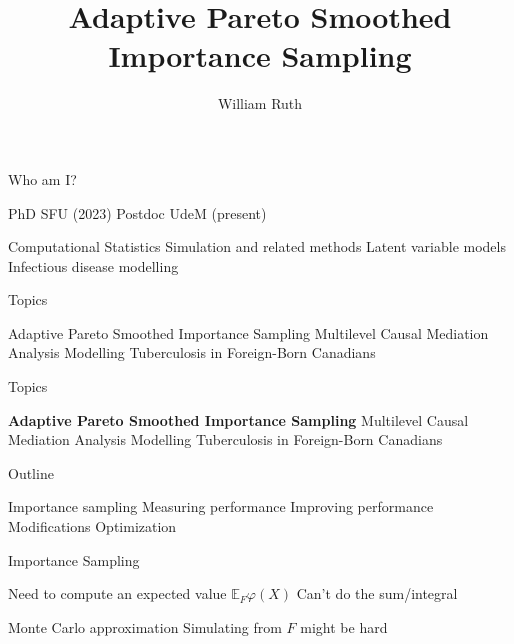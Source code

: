 \documentclass[14pt]{beamer}
\title[]{Adaptive Pareto Smoothed Importance Sampling}
\author{William Ruth}
\institute[]{Université de Montréal}
\date{\vspace{-3cm}}
\newcommand{\bE}{\mathbb{E}}
\begin{document}
\begin{frame}
    \titlepage
\end{frame}

\begin{frame}{Who am I?}
    \begin{outline}
        \1 PhD SFU (2023)
        \1 Postdoc UdeM (present) \newline

        \1 Computational Statistics
            \2 Simulation and related methods
            \2 Latent variable models
        \1 Infectious disease modelling
    \end{outline}
\end{frame}

\begin{frame}{Topics}
    \begin{outline}
        \1 Adaptive Pareto Smoothed Importance Sampling \newline
        \1 Multilevel Causal Mediation Analysis \newline
        \1 Modelling Tuberculosis in Foreign-Born Canadians
    \end{outline}
\end{frame}

\begin{frame}{Topics}
    \begin{outline}
        \1 \textbf{Adaptive Pareto Smoothed Importance Sampling} \newline
        \1 Multilevel Causal Mediation Analysis \newline
        \1 Modelling Tuberculosis in Foreign-Born Canadians
    \end{outline}
\end{frame}

\begin{frame}{Outline}
    \begin{outline}
        \1 Importance sampling \newline
        \1 Measuring performance \newline
        \1 Improving performance
            \2 Modifications
            \2 Optimization
    \end{outline}
\end{frame}


\begin{frame}{Importance Sampling}
    \begin{outline}
        \1 Need to compute an expected value
            \2 $\bE_F \varphi(X)$
        \1 Can't do the sum/integral \newline

        \1 Monte Carlo approximation
            \2 Simulating from $F$ might be hard
    \end{outline}
    \begin{equation*}
    \end{equation*}
\end{frame}
\end{document}
